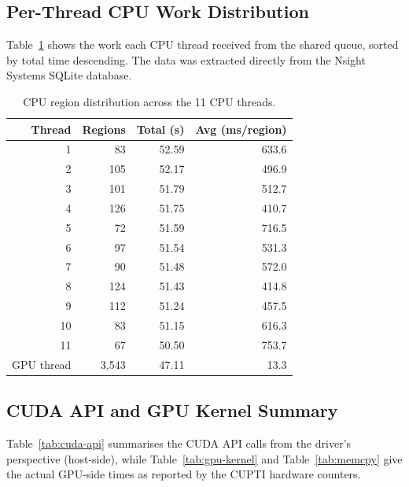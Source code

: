 \documentclass[
	english,
	letterpaper, oneside
]{article}
\begin{document}
\subsection{Per-Thread CPU Work Distribution}

Table~\ref{tab:cpu-threads} shows the work each CPU thread received from
the shared queue, sorted by total time descending. The data was extracted
directly from the Nsight Systems SQLite database.

\begin{table}[H]
    \centering
    \caption{CPU region distribution across the 11 CPU threads.}
    \label{tab:cpu-threads}
    \begin{tabular}{rrrr}
        \hline
        Thread & Regions & Total (s) & Avg (ms/region) \\
        \hline
        1  &  83 & 52.59 & 633.6 \\
        2  & 105 & 52.17 & 496.9 \\
        3  & 101 & 51.79 & 512.7 \\
        4  & 126 & 51.75 & 410.7 \\
        5  &  72 & 51.59 & 716.5 \\
        6  &  97 & 51.54 & 531.3 \\
        7  &  90 & 51.48 & 572.0 \\
        8  & 124 & 51.43 & 414.8 \\
        9  & 112 & 51.24 & 457.5 \\
        10 &  83 & 51.15 & 616.3 \\
        11 &  67 & 50.50 & 753.7 \\
        \hline
        GPU thread & 3{,}543 & 47.11 & 13.3 \\
        \hline
    \end{tabular}
\end{table}

\subsection{CUDA API and GPU Kernel Summary}

Table~\ref{tab:cuda-api} summarises the CUDA API calls from the driver's
perspective (host-side), while Table~\ref{tab:gpu-kernel} and
Table~\ref{tab:memcpy} give the actual GPU-side times as reported by the
CUPTI hardware counters.
\end{document}
